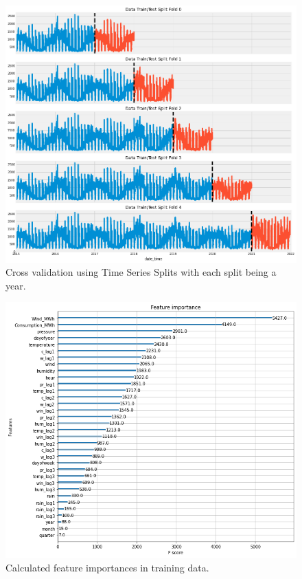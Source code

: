 \begin{figure}[H]
    \centering
    \includegraphics[width=\textwidth]{report/images/ts-cross-validation.png}
    \caption{Cross validation using Time Series Splits with each split being a year.}
    \label{fig:ts-cross-validation}
\end{figure}

\begin{figure}[H] 
\centering
\includegraphics[width=\textwidth]{report/images/feature-importance.png}
\caption{Calculated feature importances in training data.}
\label{fig:feature-importances} 
\end{figure}